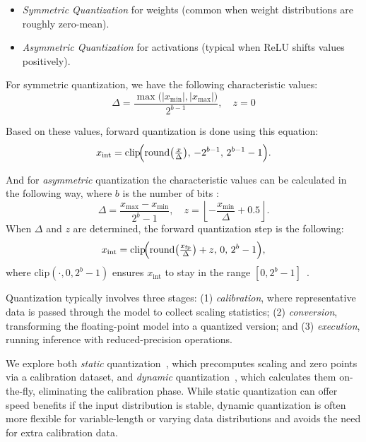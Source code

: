 \begin{itemize}
    \item \emph{Symmetric Quantization} for weights (common when weight distributions are roughly zero-mean).
    \item \emph{Asymmetric Quantization} for activations (typical when ReLU shifts values positively).
\end{itemize}
For symmetric quantization, we have the following characteristic values:
\begin{equation*}
    \Delta = \frac{\max\bigl(|x_{\min}|, |x_{\max}|\bigr)}{2^{b-1}}, 
    \quad 
    z = 0
\end{equation*}

Based on these values, forward quantization is done using this equation:
\begin{equation*}
x_{\mathrm{int}} = \mathrm{clip}\!\Bigl(
        \mathrm{round}\bigl(\tfrac{x}{\Delta}\bigr), 
        \, -2^{b-1}, \, 2^{b-1} - 1\Bigr).
\end{equation*}

And for \emph{asymmetric} quantization the characteristic values can be calculated in the following way, where $b$ is the number of bits :
\begin{equation*}
    \Delta = \frac{x_{\max} - x_{\min}}{2^b - 1}, 
    \quad 
    z = \left\lfloor - \frac{x_{\min}}{\Delta} + 0.5 \right\rfloor.
\end{equation*}
When $\Delta$ and $z$ are determined, the forward quantization step is the following:
\begin{equation*}
    x_{\mathrm{int}} = \mathrm{clip}\!\Bigl(
        \mathrm{round}\bigl(\tfrac{x_{\mathrm{fp}}}{\Delta}\bigr) + z , 
        \, 0, \, 2^b - 1\Bigr),
\end{equation*}
where $\mathrm{clip}(\cdot,0,2^b-1)$ ensures $x_{\mathrm{int}}$ to stay in the range $[0, 2^b - 1]$~\cite{quant_data}.

Quantization typically involves three stages: (1) \emph{calibration}, where representative data is passed through the model to collect scaling statistics; (2) \emph{conversion}, transforming the floating-point model into a quantized version; and (3) \emph{execution}, running inference with reduced-precision operations.

We explore both \emph{static} quantization~\cite{FU20092937}, which precomputes scaling and zero points via a calibration dataset, and \emph{dynamic} quantization~\cite{vu2008stabilizing}, which calculates them on-the-fly, eliminating the calibration phase. While static quantization can offer speed benefits if the input distribution is stable, dynamic quantization is often more flexible for variable-length or varying data distributions and avoids the need for extra calibration data.

